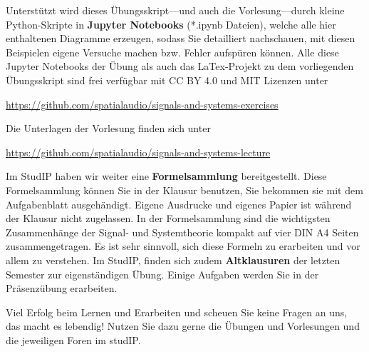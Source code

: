 Unterstützt wird dieses Übungsskript---und auch die Vorlesung---durch kleine Python-Skripte in
\textbf{Jupyter Notebooks} (*.ipynb Dateien),
welche alle hier enthaltenen Diagramme erzeugen, sodass Sie
detailliert nachschauen, mit diesen Beispielen eigene Versuche machen
bzw. Fehler aufspüren können.
%
Alle diese Jupyter Notebooks der Übung als auch das LaTex-Projekt zu dem vorliegenden Übungsskript sind frei verfügbar mit CC BY 4.0 und MIT Lizenzen unter
\begin{mdframed}[backgroundcolor=C2!10]
\url{https://github.com/spatialaudio/signals-and-systems-exercises}
\end{mdframed}
%
Die Unterlagen der Vorlesung finden sich unter
\begin{mdframed}[backgroundcolor=C2!10]
\url{https://github.com/spatialaudio/signals-and-systems-lecture}
\end{mdframed}
%
%


Im StudIP haben wir weiter eine \textbf{Formelsammlung} bereitgestellt.
%
Diese Formelsammlung können Sie in der Klausur benutzen, Sie bekommen sie
mit dem Aufgabenblatt ausgehändigt.
%
Eigene Ausdrucke und eigenes Papier ist während der Klausur nicht zugelassen.
%
In der Formelsammlung sind die wichtigsten Zusammenhänge der Signal- und
Systemtheorie kompakt auf vier DIN A4 Seiten zusammengetragen.
%
Es ist sehr sinnvoll, sich diese Formeln zu erarbeiten und vor allem zu verstehen.
%
Im StudIP, finden sich zudem \textbf{Altklausuren} der letzten Semester zur eigenständigen Übung. Einige Aufgaben werden Sie in der Präsenzübung erarbeiten.

Viel Erfolg beim Lernen und Erarbeiten und scheuen Sie keine Fragen an uns, das macht es lebendig!
Nutzen Sie dazu gerne die Übungen und Vorlesungen und die
jeweiligen Foren im studIP.


\newpage
